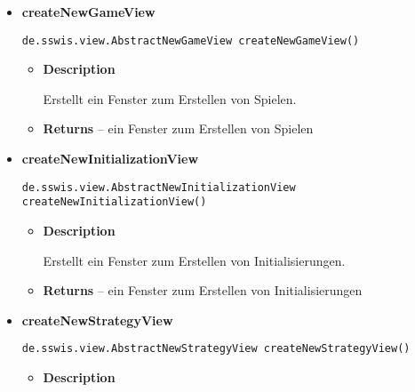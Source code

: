 {{{{\begin{itemize}
{\begin{itemize}
{Erstellt ein Fenster zum Erstellen von Konfigurationen.
}
\item{{\bf  Returns} -- 
ein Fenster zum Erstellen von Konfigurationen 
}%
\end{itemize}
}%
\item{ 
\hypertarget{de.sswis.controller.AbstractGuiFactory.createNewGameView()}{{\bf  createNewGameView}\\}
\begin{lstlisting}[frame=none]
de.sswis.view.AbstractNewGameView createNewGameView()\end{lstlisting} %
\begin{itemize}
\item{
{\bf  Description}

Erstellt ein Fenster zum Erstellen von Spielen.
}
\item{{\bf  Returns} -- 
ein Fenster zum Erstellen von Spielen 
}%
\end{itemize}
}%
\item{ 
\hypertarget{de.sswis.controller.AbstractGuiFactory.createNewInitializationView()}{{\bf  createNewInitializationView}\\}
\begin{lstlisting}[frame=none]
de.sswis.view.AbstractNewInitializationView createNewInitializationView()\end{lstlisting} %
\begin{itemize}
\item{
{\bf  Description}

Erstellt ein Fenster zum Erstellen von Initialisierungen.
}
\item{{\bf  Returns} -- 
ein Fenster zum Erstellen von Initialisierungen 
}%
\end{itemize}
}%
\item{ 
\hypertarget{de.sswis.controller.AbstractGuiFactory.createNewStrategyView()}{{\bf  createNewStrategyView}\\}
\begin{lstlisting}[frame=none]
de.sswis.view.AbstractNewStrategyView createNewStrategyView()\end{lstlisting} %
\begin{itemize}
\item{
{\bf  Description}

}
\end{itemize}}
\end{itemize}}}}}
